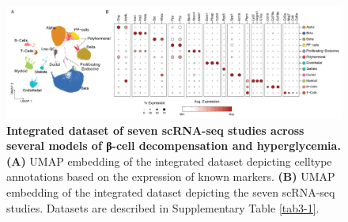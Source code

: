



\begin{figure}[H]
\centering
\includegraphics[width=\linewidth]{Chapter5/Fig/F3-2-v2-01.png}
\caption[Annotation of the full integrated dataset using marker genes]{\textbf{Integrated dataset of seven scRNA-seq studies across several models of β-cell decompensation and hyperglycemia.} \textbf{(A)} UMAP embedding of the integrated dataset depicting celltype annotations based on the expression of known markers. \textbf{(B)} UMAP embedding of the integrated dataset depicting the seven scRNA-seq studies. Datasets are described in Supplementary Table \ref{tab3-1}.}
\label{fig:3-2}
\end{figure}

